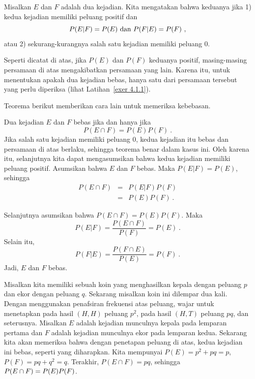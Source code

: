 \begin{definition}\label{def 4.2}
Misalkan $E$ dan $F$ adalah dua kejadian.  Kita mengatakan bahwa keduanya  jika 1) kedua kejadian memiliki peluang positif dan
$$
P(E|F) = P(E)\ {\rm dan}\ P(F|E) = P(F)\ ,
$$
atau 2) sekurang-kurangnya salah satu kejadian memiliki peluang 0.
\end{definition}

Seperti dicatat di atas, jika $P(E)$ dan $P(F)$ keduanya positif, masing-masing persamaan di atas
mengakibatkan persamaan yang lain. Karena itu, untuk menentukan apakah dua kejadian bebas, hanya satu dari
persamaan tersebut yang perlu diperiksa (lihat Latihan~\ref{exer 4.1.1}).
\par
Teorema berikut memberikan cara lain untuk memeriksa kebebasan.

\begin{theorem}\label{thm 4.1}
Dua kejadian $E$ dan $F$ bebas jika dan hanya jika 
$$P(E\cap F) = P(E)P(F)\ .$$
\proof
Jika salah satu kejadian memiliki peluang 0, kedua kejadian itu bebas dan persamaan di atas 
berlaku, sehingga teorema benar dalam kasus ini.  Oleh karena itu, selanjutnya kita dapat mengasumsikan bahwa kedua kejadian memiliki 
peluang positif. Asumsikan bahwa $E$ dan $F$ bebas.  Maka $P(E|F) = P(E)$, sehingga
\begin{eqnarray*}
P(E\cap F) & = & P(E|F)P(F) \\
       & = & P(E)P(F)\ .
\end{eqnarray*}

Selanjutnya asumsikan bahwa $P(E\cap F) = P(E)P(F)$.  Maka
$$
P(E|F) = \frac {P(E \cap F)}{P(F)} = P(E)\ .
$$
Selain itu,
$$
P(F|E) = \frac {P(F \cap E)}{P(E)} = P(F)\ .
$$
Jadi, $E$ dan $F$ bebas.
\end{theorem}

\begin{example}\label{exam 4.6}
Misalkan kita memiliki sebuah koin yang menghasilkan kepala dengan peluang $p$ dan ekor dengan peluang
$q$.  Sekarang misalkan koin ini dilempar dua kali.  Dengan menggunakan penafsiran frekuensi atas peluang, wajar untuk menetapkan
pada hasil $(H,H)$ peluang $p^2$, pada hasil $(H, T)$ peluang $pq$, dan seterusnya.  
Misalkan $E$ adalah kejadian munculnya kepala pada lemparan pertama dan $F$ adalah kejadian munculnya ekor pada
lemparan kedua.  Sekarang kita akan memeriksa bahwa dengan penetapan peluang di atas, kedua kejadian ini
bebas, seperti yang diharapkan.  Kita mempunyai $P(E) = p^2 + pq = p$, $P(F) = pq + q^2 = q$.  Terakhir, $P(E\cap
F) = pq$, sehingga $P(E\cap F) = \linebreak[4] P(E)P(F)$.  
\end{example}

